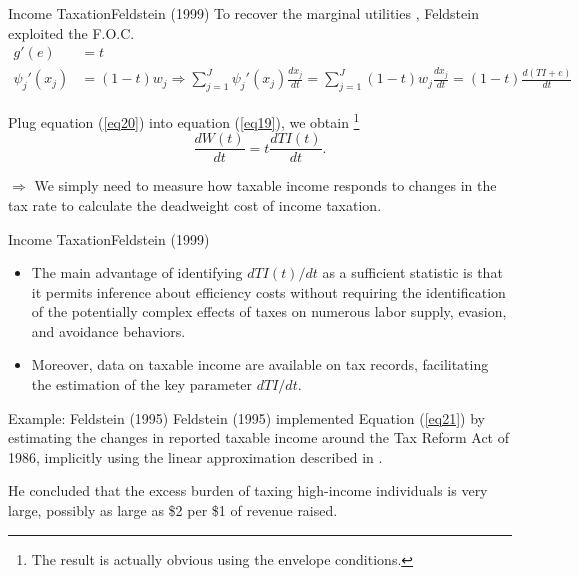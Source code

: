 \documentclass{beamer}
\begin{document}
\begin{frame}[label=feldstein1999]{Income Taxation}{Feldstein (1999)}
	To recover the marginal utilities \hyperlink{ex_hgb_back}{}, Feldstein exploited the F.O.C.
	\begin{equation}\label{eq20}
		\begin{aligned}
			g'(e) &= t \\
			\psi_j'(x_j) &= (1-t)w_j \Rightarrow \sum_{j=1}^J\psi_j'(x_j)\frac{dx_j}{dt} = \sum_{j=1}^J(1-t)w_j\frac{dx_j}{dt} = (1-t)\frac{d(TI+e)}{dt}
		\end{aligned}
	\end{equation}

	Plug equation (\ref{eq20}) into equation (\ref{eq19}), we obtain \footnote{The result is actually obvious using the envelope conditions.}
	\begin{equation}\label{eq21}
		\frac{dW(t)}{dt} = t\frac{dTI(t)}{dt}.
	\end{equation}

	$\Rightarrow$ We simply need to measure how taxable income responds to changes in the tax rate to calculate the deadweight cost of income taxation.
\end{frame}
\begin{frame}[label=ex_feldstein1995]{Income Taxation}{Feldstein (1999)}
	\begin{itemize}
		\item The main advantage of identifying $dTI(t)/dt$ as a sufficient statistic is that it permits inference about efficiency costs without requiring the identification of the potentially complex effects of taxes on numerous labor supply, evasion, and avoidance behaviors.
		\medskip
		\item Moreover, data on taxable income are available on tax records, facilitating the estimation of the key parameter $dTI/dt$.
	\end{itemize}
	\begin{block}{Example: Feldstein (1995)}
		Feldstein (1995) implemented Equation (\ref{eq21}) by estimating the changes in reported taxable income around the Tax Reform Act of 1986, implicitly using the linear approximation described in  \hyperlink{step5}{}.
		\medskip

		He concluded that the excess burden of taxing high-income individuals is very large, possibly as large as \$2 per \$1 of revenue raised.
	\end{block}
\end{frame}
\end{document}
